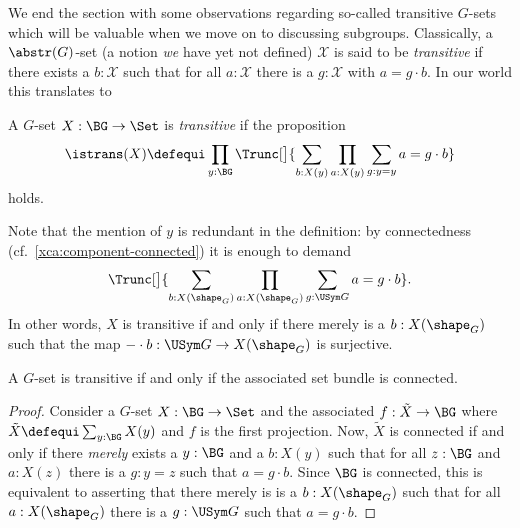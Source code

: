 \label{sec:transitiveGsets}
We end the section with some observations regarding so-called transitive $G$-sets which will be valuable when we move on to discussing subgroups.
Classically, a $\abstr(G)$-set (a notion \emph{we} have yet not defined) $\mathcal X$ is said to be \emph{transitive} if there exists a $b:\mathcal X$ such that for all $a:\mathcal X$ there is a $g:\mathcal X$ with $a=g\cdot b$.  In our world this translates to
\begin{definition}\label{def:transitiveGset}
  A $G$-set $X:\BG\to\Set$ is \emph{transitive} if the proposition
  \[
    \istrans(X) \defequi \prod_{y:\BG}
    \Trunc[\big]{\sum_{b:X(y)} \prod_{a:X(y)} \sum_{g:y=y} a=g\cdot b}
  \]
  holds.
\end{definition}
\begin{remark}

Note that the mention of $y$ is redundant in the definition: by
connectedness (cf.~\cref{xca:component-connected}) it is enough to
demand
\begin{displaymath}
  \Trunc[\big]{\sum_{b:X(\shape_G)}\prod_{a:X(\shape_G)}\sum_{g:\USym G}a=g\cdot b}.
\end{displaymath}
In other words, $X$ is transitive if and only if there merely is a
$b:X(\shape_G)$ such that the map $-\cdot b:\USym G\to X(\shape_G)$ is
surjective.
\end{remark}

\begin{lemma}
  \label{lem:conistrans}
  A $G$-set  is transitive if and only if the associated set bundle is connected.
\end{lemma}
\begin{proof}
  Consider a $G$-set $X:\BG\to\Set$ and the associated \covering
  $f:\tilde X\to\BG$ where $\tilde X\defequi\sum_{y:\BG}X(y)$ and $f$
  is the first projection.  Now, $\tilde X$ is connected if and only
  if there {\em merely} exists a $y:\BG$ and a $b:X(y)$ such that for
  all $z:\BG$ and $a:X(z)$ there is a $g:y=z$ such that $a=g\cdot b$.
  Since $\BG$ is connected, this is equivalent to asserting that there
  merely is is a $b:X(\shape_G)$ such that for all $a:X(\shape_G)$ there is
  a $g:\USym G$ such that $a=g\cdot b$.
\end{proof}

